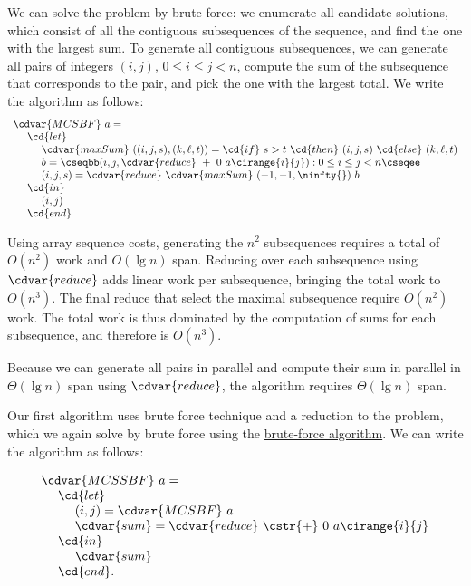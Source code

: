 \begin{algorithm}
\label{alg:mcss::bf-alg::mcs}
We can solve the \MCS{} problem by brute force: we enumerate all
candidate solutions, which consist of all the contiguous subsequences
of the sequence, and find the one with the largest sum.
%
To generate all contiguous subsequences, we can generate all pairs of
integers $(i,j)$, $0 \le i \le j < n$, compute the sum of the
subsequence that corresponds to the pair, and pick the  one with the
largest total.  We write the algorithm as follows:
%
\[
\begin{array}{l}
\cdvar{MCSBF}~a =
\\
~~~~\cd{let} 
\\
~~~~~~~~\cdvar{maxSum}~((i, j, s), (k, \ell, t)) = \cd{if}~s > t~\cd{then}~(i, j, s)~\cd{else}~(k, \ell, t) 
\\
~~~~~~~~b = \cseqbb (i, j, \cdvar{reduce}~+~0~a\cirange{i}{j})  : 0  \le i \le j < n \cseqee
\\
~~~~~~~~(i, j, s) = \cdvar{reduce}~\cdvar{maxSum}~(-1, -1, \ninfty{})~b
\\
~~~~\cd{in}
\\
~~~~~~~~(i, j)
\\
~~~~\cd{end}
\end{array}
\]

\end{algorithm}

\begin{gram}
Using array sequence costs, generating the $n^2$ subsequences requires
a total of $O(n^2)$ work and $O(\lg{n})$ span.
%
Reducing over each subsequence using $\cdvar{reduce}$ adds linear work
per subsequence, bringing the total work to $O(n^3)$. 
%
The final reduce that select the maximal subsequence require $O(n^2)$
work.
%
The total work is thus dominated by the computation of sums for each
subsequence, and therefore is $O(n^3)$.

Because we can generate all pairs in parallel and compute their sum in
parallel in $\Theta(\lg{n})$ span using $\cdvar{reduce}$, the algorithm
requires $\Theta(\lg{n})$ span.
\end{gram}


\begin{algorithm}
\label{alg:mcss::bf-alg::mcss}

Our first algorithm uses brute force technique and a reduction to the
\MCS{} problem, which we again solve by brute force using the
\href{alg:mcss::bf-alg::mcs}{brute-force \MCS{} algorithm}.
%
We can write the algorithm as follows:

\[
\begin{array}{l}
\cdvar{MCSSBF}~a =
\\
~~~~\cd{let} 
\\
~~~~~~~~(i, j) =  \cdvar{MCSBF}~a
\\
~~~~~~~~\cdvar{sum} = \cdvar{reduce}~\cstr{+}~0~a\cirange{i}{j}
\\
~~~~\cd{in}
\\
~~~~~~~~\cdvar{sum}
\\
~~~~\cd{end}.
\end{array}
\]
\end{algorithm}


